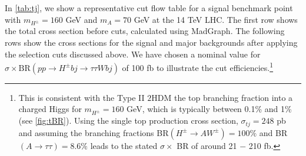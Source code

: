 In \autoref{tab:tj}, we show a representative cut flow table for a signal benchmark point with $m_{H^{\pm}} = 160$ GeV and $m_A = 70$ GeV at the 14 TeV LHC. The first row shows the total cross section before cuts, calculated using MadGraph. The following rows show the cross sections for the signal and major backgrounds after applying the selection cuts discussed above. We have chosen a nominal value for $\sigma \times \text{BR}( p p \rightarrow H^{\pm} b j \rightarrow \tau \tau W bj)$ of 100 fb to illustrate the cut efficiencies.\footnote{This is consistent with the Type II $2$HDM the top branching fraction into a charged Higgs for $m_{H^{\pm}}=160$ GeV, which is typically between 0.1\% and 1\% (see \autoref{fig:tBR}). Using the single top production cross section, $\sigma_{tj}=248$ pb \cite{Kidonakis:2012db} and assuming the branching fractions BR$(H^{\pm} \rightarrow AW^{\pm}) = 100 \%$ and BR$(A \rightarrow \tau\tau)=8.6 \%$ leads to the stated $\sigma\times$ BR of around 21 $-$ 210 fb. }

